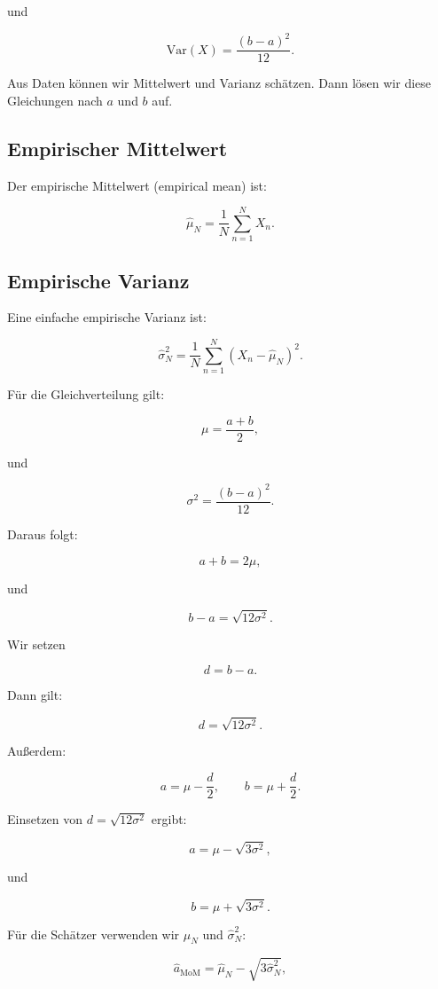 und

\[
    \mathrm{Var}(X)
    =
    \frac{(b-a)^2}{12}.
\]

Aus Daten können wir Mittelwert und Varianz schätzen.
Dann lösen wir diese Gleichungen nach \(a\) und \(b\) auf.

\subsection{Empirischer Mittelwert}

Der empirische Mittelwert (empirical mean) ist:

\[
    \hat{\mu}_N
    =
    \frac{1}{N}
    \sum_{n=1}^{N}
    X_n.
\]

\subsection{Empirische Varianz}

Eine einfache empirische Varianz ist:

\[
    \hat{\sigma}^2_N
    =
    \frac{1}{N}
    \sum_{n=1}^{N}
    (X_n-\hat{\mu}_N)^2.
\]

Für die Gleichverteilung gilt:

\[
    \mu
    =
    \frac{a+b}{2},
\]

und

\[
    \sigma^2
    =
    \frac{(b-a)^2}{12}.
\]

Daraus folgt:

\[
    a+b = 2\mu,
\]

und

\[
    b-a = \sqrt{12\sigma^2}.
\]

Wir setzen

\[
    d = b-a.
\]

Dann gilt:

\[
    d = \sqrt{12\sigma^2}.
\]

Außerdem:

\[
    a = \mu - \frac{d}{2},
    \qquad
    b = \mu + \frac{d}{2}.
\]

Einsetzen von \(d=\sqrt{12\sigma^2}\) ergibt:

\[
    a = \mu - \sqrt{3\sigma^2},
\]

und

\[
    b = \mu + \sqrt{3\sigma^2}.
\]

Für die Schätzer verwenden wir \(\hat{\mu}_N\) und \(\hat{\sigma}^2_N\):

\[
    \hat{a}_{\mathrm{MoM}}
    =
    \hat{\mu}_N
    -
    \sqrt{3\hat{\sigma}^2_N},
\]

